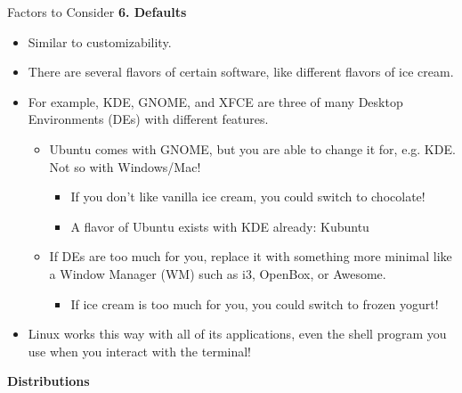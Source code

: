 \documentclass[11pt]{beamer}
\begin{document}
\begin{frame}[t]{Factors to Consider}
	\textbf{\LARGE 6. Defaults}
	\begin{itemize}
		\item Similar to customizability.
		\item There are several flavors of certain software, like different flavors of ice cream.
		\item For example, KDE, GNOME, and XFCE are three of many Desktop Environments (DEs) with different features.
		\begin{itemize}
			\item Ubuntu comes with GNOME, but you are able to change it for, e.g. KDE. Not so with Windows/Mac!
			\begin{itemize}
				\item If you don't like vanilla ice cream, you could switch to chocolate!
				\item A flavor of Ubuntu exists with KDE already: Kubuntu
			\end{itemize}
			\item If DEs are too much for you, replace it with something more minimal like a Window Manager (WM) such as i3, OpenBox, or Awesome.
			\begin{itemize}
				\item If ice cream is too much for you, you could switch to frozen yogurt!
			\end{itemize}
		\end{itemize}
		\item Linux works this way with all of its applications, even the shell program you use when you interact with the terminal!
	\end{itemize}
\end{frame}

\begin{frame}
	\centering\textbf{\Huge Distributions}
\end{frame}
\end{document}
